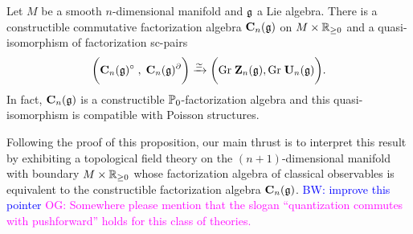 \documentclass[11pt]{amsart}
\numberwithin{equation}{section}
\def\brian{\textcolor{blue}{BW: }\textcolor{blue}}
\def\owen{\textcolor{magenta}{OG: }\textcolor{magenta}}
\begin{document}

\begin{prp}
\label{prp:pair}
Let $M$ be a smooth $n$-dimensional manifold and $\mathfrak g$ a Lie algebra. 
There is a constructible commutative factorization algebra ${\bf C}_n (\mathfrak g)$
on $M \times \mathbb R_{\geq 0}$ and a quasi-isomorphism of factorization sc-pairs
\[
\bigg( {\bf C}_n (\mathfrak g)^\circ \; , \; {\bf C}_n (\mathfrak g)^\partial \bigg) \xrightarrow{\simeq} \bigg({\rm Gr} \; \mathbf Z_n(\mathfrak g), {\rm Gr} \; \mathbf U_n(\mathfrak g) \bigg).
\]
In fact, $\mathbf C_n(\mathfrak g)$ is a constructible $\mathbb P_0$-factorization algebra and this quasi-isomorphism is compatible with Poisson structures.
\end{prp}


Following the proof of this proposition, our main thrust is to interpret this result by exhibiting a topological field theory on the $(n+1)$-dimensional manifold with boundary $M \times \mathbb R_{\geq 0}$ whose factorization algebra of classical observables is equivalent to the constructible factorization algebra $\mathbf C_n(\mathfrak g)$. 
\brian{improve this pointer}
\owen{Somewhere please mention that the slogan ``quantization commutes with pushforward'' holds for this class of theories.}

%


\end{document}
